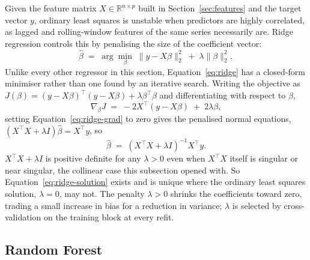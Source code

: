 \documentclass[12pt,a4paper]{report}
\begin{document}
Given the feature matrix $X \in \mathbb{R}^{n\times p}$ built in
Section~\ref{sec:features} and the target vector $y$, ordinary least squares
is unstable when predictors are highly correlated, as lagged and
rolling-window features of the same series necessarily are. Ridge regression
\citep{hoerl1970ridge} controls this by penalising the size of the
coefficient vector:
\begin{equation}
\hat\beta \;=\; \arg\min_{\beta} \; \|y - X\beta\|_2^2 \;+\; \lambda \|\beta\|_2^2,
\label{eq:ridge}
\end{equation}
Unlike every other regressor in this section, Equation~\ref{eq:ridge} has a
closed-form minimiser rather than one found by an iterative search. Writing
the objective as $J(\beta) = (y-X\beta)^\top(y-X\beta) + \lambda\beta^\top\beta$
and differentiating with respect to $\beta$,
\begin{equation}
\nabla_\beta J \;=\; -2X^\top(y-X\beta) \;+\; 2\lambda\beta,
\label{eq:ridge-grad}
\end{equation}
setting Equation~\ref{eq:ridge-grad} to zero gives the penalised normal
equations, $(X^\top X + \lambda I)\hat\beta = X^\top y$, so
\begin{equation}
\hat\beta \;=\; (X^\top X + \lambda I)^{-1} X^\top y.
\label{eq:ridge-solution}
\end{equation}
$X^\top X + \lambda I$ is positive definite for any $\lambda > 0$ even when
$X^\top X$ itself is singular or near singular, the collinear case this
subsection opened with. So Equation~\ref{eq:ridge-solution} exists and is
unique where the ordinary least squares solution, $\lambda = 0$, may not.
The penalty $\lambda > 0$ shrinks the coefficients toward zero, trading a
small increase in bias for a reduction in variance; $\lambda$ is selected by
cross-validation on the training block at every refit.

\subsection{Random Forest}
\end{document}
